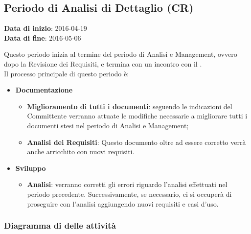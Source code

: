 	\subsection{Periodo di Analisi di Dettaglio (CR)}
	\begin{center}
		\textbf{Data di inizio}: 2016-04-19 \\
		\textbf{Data di fine}: 2016-05-06 \\
	\end{center}
	Questo periodo inizia al termine del periodo di Analisi e Management, ovvero dopo la Revisione dei Requisiti, e termina con un incontro con il . \\ 
	Il processo principale di questo periodo è:
	\begin{itemize}
		\item \textbf{Documentazione}
		\att
		\begin{itemize}
			\item \textbf{Miglioramento di tutti i documenti}: seguendo le indicazioni del Committente verranno attuate le modifiche necessarie a migliorare tutti i documenti stesi nel periodo di Analisi e Management;
			\item \textbf{Analisi dei Requisiti}: Questo documento oltre ad essere corretto verrà anche arricchito con nuovi requisiti.
		\end{itemize}
		\item \textbf{Sviluppo}
		\att
		\begin{itemize}
			\item \textbf{Analisi}: verranno corretti gli errori riguardo l'analisi effettuati nel periodo precedente. Successivamente, se necessario, ci si occuperà di proseguire con l'analisi aggiungendo nuovi requisiti e casi d'uso.
		\end{itemize}
	\end{itemize}
		
		
		\subsubsection{Diagramma di  delle attività}
		

